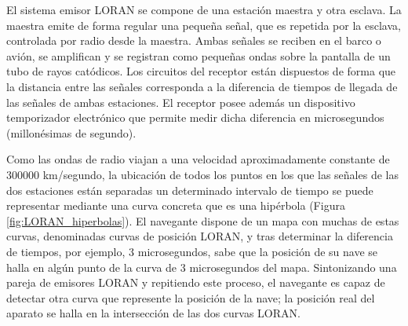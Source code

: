  El sistema emisor LORAN se compone de una estaci\'on maestra y otra esclava. La maestra emite de forma regular una peque\~na se\~nal, que es repetida por la esclava, controlada por radio desde la maestra. Ambas se\~nales se reciben en el barco o avi\'on, se amplifican y se registran como peque\~nas ondas sobre la pantalla de un tubo de rayos cat\'odicos. Los circuitos del receptor est\'an dispuestos de forma que la distancia entre las se\~nales corresponda a la diferencia de tiempos de llegada de las se\~nales de ambas estaciones. El receptor posee adem\'as un dispositivo temporizador electr\'onico que permite medir dicha diferencia en microsegundos (millon\'esimas de segundo).

Como las ondas de radio viajan a una velocidad aproximadamente constante de 300000 km/segundo, la ubicaci\'on de todos los puntos en los que las se\~nales de las dos estaciones est\'an separadas un determinado intervalo de tiempo se puede representar mediante una curva concreta que es una hip\'erbola (Figura \ref{fig:LORAN_hiperbolas}). El navegante dispone de un mapa con muchas de estas curvas, denominadas curvas de posici\'on LORAN, y tras determinar la diferencia de tiempos, por ejemplo, 3 microsegundos, sabe que la posici\'on de su nave se halla en alg\'un punto de la curva de 3 microsegundos del mapa. Sintonizando una pareja de emisores LORAN y repitiendo este proceso, el navegante es capaz de detectar otra curva que represente la posici\'on de la nave; la posici\'on real del aparato se halla en la intersecci\'on de las dos curvas LORAN. 


